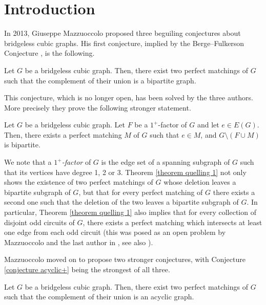 \documentclass[]{theclass}
\begin{document}
\section{Introduction}

In 2013, Giuseppe Mazzuoccolo \cite{MazzuoccoloS4} proposed three beguiling conjectures about bridgeless cubic graphs. His first conjecture, implied by the Berge--Fulkerson Conjecture \cite{BergeFulkerson}, is the following.

\begin{conjecture}
Let $G$ be a bridgeless cubic graph. Then, there exist two perfect matchings of $G$ such that the complement of their union is a bipartite graph.
\end{conjecture}

This conjecture, which is no longer open, has been solved by the three authors. More precisely they prove the following stronger statement.

\begin{theorem}\label{theorem quelling 1}
Let $G$ be a bridgeless cubic graph. Let $F$ be a $1^+$-factor of $G$ and let $e\in E(G)$. Then, there exists a perfect matching $M$ of $G$ such that $e\in M$, and $G\setminus (F\cup M)$ is bipartite.
\end{theorem}

We note that a \emph{$1^+$-factor} of $G$ is the edge set of a spanning subgraph of $G$ such that its vertices have degree 1, 2 or 3. Theorem \ref{theorem quelling 1} not only shows the existence of two perfect matchings of $G$ whose deletion leaves a bipartite subgraph of $G$, but that for every perfect matching of $G$ there exists a second one such that the deletion of the two leaves a bipartite subgraph of $G$. In particular, Theorem \ref{theorem quelling 1} also implies that for every collection of disjoint odd circuits of $G$, there exists a perfect matching  which intersects at least one edge from each odd circuit (this was posed as an open problem by Mazzuoccolo and the last author in \cite{s4gmjp}, see also \cite{zerafa thesis}).

Mazzuoccolo moved on to propose two stronger conjectures, with Conjecture \ref{conjecture acyclic+} being the strongest of all three.

\begin{conjecture}\label{conjecture acyclic}
Let $G$ be a bridgeless cubic graph. Then, there exist two perfect matchings of $G$ such that the complement of their union is an acyclic graph.
\end{conjecture} 
\end{document}
